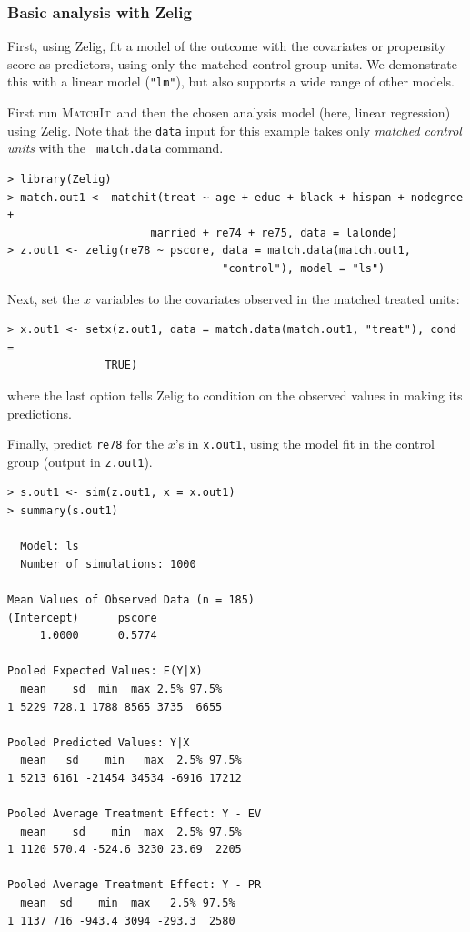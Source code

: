 \documentclass[oneside,letterpaper,titlepage]{article}
\newcommand{\hlink}{\htmladdnormallink}
\newcommand{\MatchIt}{\textsc{MatchIt}}
\begin{document}
\subsubsection{Basic analysis with Zelig}

First, using Zelig, fit a model of the outcome with the covariates or
propensity score as predictors, using only the matched control group
units.  We demonstrate this with a linear model ({\tt "lm"}), but
\hlink{Zelig}{http://gking.harvard.edu/zelig} also supports a wide
range of other models.

First run \MatchIt\ and then the chosen analysis model (here, linear
regression) using Zelig.  Note that the {\tt data} input for this
example takes only \emph{matched control units} with the {\tt
  match.data} command.
\begin{verbatim}
> library(Zelig)
> match.out1 <- matchit(treat ~ age + educ + black + hispan + nodegree +
                      married + re74 + re75, data = lalonde)
> z.out1 <- zelig(re78 ~ pscore, data = match.data(match.out1,
                                 "control"), model = "ls")
\end{verbatim}
Next, set the $x$ variables to the covariates observed in the matched
treated units:
\begin{verbatim}
> x.out1 <- setx(z.out1, data = match.data(match.out1, "treat"), cond =
               TRUE)
\end{verbatim}
where the last option tells Zelig to condition on the observed values
in making its predictions.

Finally, predict {\tt re78} for the $x$'s in {\tt x.out1}, using the
model fit in the control group (output in {\tt z.out1}).

\begin{verbatim}
> s.out1 <- sim(z.out1, x = x.out1)
> summary(s.out1)

  Model: ls 
  Number of simulations: 1000 

Mean Values of Observed Data (n = 185) 
(Intercept)      pscore 
     1.0000      0.5774 

Pooled Expected Values: E(Y|X)
  mean    sd  min  max 2.5% 97.5%
1 5229 728.1 1788 8565 3735  6655

Pooled Predicted Values: Y|X
  mean   sd    min   max  2.5% 97.5%
1 5213 6161 -21454 34534 -6916 17212

Pooled Average Treatment Effect: Y - EV
  mean    sd    min  max  2.5% 97.5%
1 1120 570.4 -524.6 3230 23.69  2205

Pooled Average Treatment Effect: Y - PR
  mean  sd    min  max   2.5% 97.5%
1 1137 716 -943.4 3094 -293.3  2580
\end{verbatim}
\end{document}
